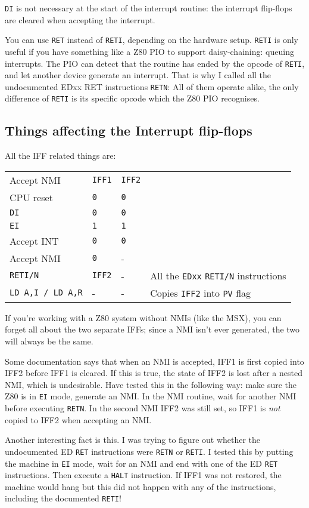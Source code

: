 \documentclass[12pt,twoside,openright,a4paper]{book}
\begin{document}
{\tt DI} is not necessary at the start of the interrupt routine: the interrupt flip-flops are cleared when accepting the interrupt.

You can use {\tt RET} instead of {\tt RETI}, depending on the hardware setup. {\tt RETI} is only useful if you have something like a Z80 PIO to support daisy-chaining: queuing interrupts. The PIO can detect that the routine has ended by the opcode of {\tt RETI}, and let another device generate an interrupt. That is why I called all the undocumented EDxx RET instructions {\tt RETN}: All of them operate alike, the only difference of {\tt RETI} is its specific opcode which the Z80 PIO recognises.


\subsection{Things affecting the Interrupt flip-flops}
\label{flipflop}

All the IFF related things are:

\begin{tabular}{llll}
	Accept NMI	& {\tt IFF1}	& {\tt IFF2} \\
	CPU reset	& {\tt 0}		& {\tt 0}\\
	{\tt DI}	& {\tt 0}		& {\tt 0}\\
	{\tt EI}	& {\tt 1}		& {\tt 1}\\
	Accept INT	& {\tt 0}		& {\tt 0}\\
	Accept NMI	& {\tt 0}		& -\\
	{\tt RETI/N}& {\tt IFF2}	& - & All the {\tt EDxx} {\tt RETI/N} instructions\\
	{\tt LD A,I / LD A,R} & - & - & Copies {\tt IFF2} into {\tt PV} flag
\end{tabular}

If you're working with a Z80 system without NMIs (like the MSX), you can forget all about the two separate IFFs; since a NMI isn't ever generated, the two will always be the same. 

Some documentation says that when an NMI is accepted, IFF1 is first copied into IFF2 before IFF1 is cleared. If this is true, the state of IFF2 is lost after a nested NMI, which is undesirable. Have tested this in the following way: make sure the Z80 is in {\tt EI} mode, generate an NMI. In the NMI routine, wait for another NMI before executing {\tt RETN}. In the second NMI IFF2 was still set, so IFF1 is {\em not} copied to IFF2 when accepting an NMI.

Another interesting fact is this. I was trying to figure out whether the undocumented ED {\tt RET} instructions were {\tt RETN} or {\tt RETI}. I tested this by putting the machine in {\tt EI} mode, wait for an NMI and end with one of the ED {\tt RET} instructions. Then execute a {\tt HALT} instruction. If IFF1 was not restored, the machine would hang but this did not happen with any of the instructions, including the documented {\tt RETI}!
\end{document}
